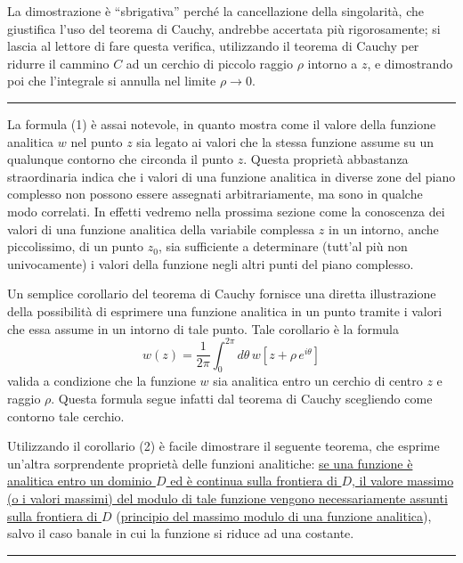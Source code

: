 \documentclass[11pt, a4paper]{book}
\numberwithin{equation}{section}
\begin{document}
La dimostrazione è ``sbrigativa'' perché la cancellazione della singolarità, che giustifica l'uso del teorema di Cauchy, andrebbe accertata più rigorosamente; si lascia al lettore di fare questa verifica, utilizzando il teorema di Cauchy per ridurre il cammino $C$ ad un cerchio di piccolo raggio $\rho$ intorno a $z$, e dimostrando poi che l'integrale si annulla nel limite $\rho \to 0$.

\medskip\hrule\medskip

La formula (1) è assai notevole, in quanto mostra come il valore della funzione analitica $w$ nel punto $z$ sia legato ai valori che la stessa funzione assume su un qualunque contorno che circonda il punto $z$. Questa proprietà abbastanza straordinaria indica che i valori di una funzione analitica in diverse zone del piano complesso non possono essere assegnati arbitrariamente, ma sono in qualche modo correlati. In effetti vedremo nella prossima sezione come la conoscenza dei valori di una funzione analitica della variabile complessa $z$ in un intorno, anche piccolissimo, di un punto $z_0$, sia sufficiente a determinare (tutt'al più non univocamente) i valori della funzione negli altri punti del piano complesso.

Un semplice corollario del teorema di Cauchy fornisce una diretta illustrazione della possibilità di esprimere una funzione analitica in un punto tramite i valori che essa assume in un intorno di tale punto. Tale corollario è la formula
\begin{equation}
w(z) = \frac{1}{2\pi} \int_0^{2\pi} d\theta\, w\!\left[z + \rho\, e^{i\theta}\right] \tag{2}
\end{equation}
valida a condizione che la funzione $w$ sia analitica entro un cerchio di centro $z$ e raggio $\rho$. Questa formula segue infatti dal teorema di Cauchy scegliendo come contorno tale cerchio.

Utilizzando il corollario (2) è facile dimostrare il seguente teorema, che esprime un'altra sorprendente proprietà delle funzioni analitiche: \uline{se una funzione è analitica entro un dominio $D$ ed è continua sulla frontiera di $D$, il valore massimo (o i valori massimi) del modulo di tale funzione vengono necessariamente assunti sulla frontiera di $D$} (\uline{principio del massimo modulo di una funzione analitica}), salvo il caso banale in cui la funzione si riduce ad una costante.

\medskip\hrule\medskip
\end{document}
